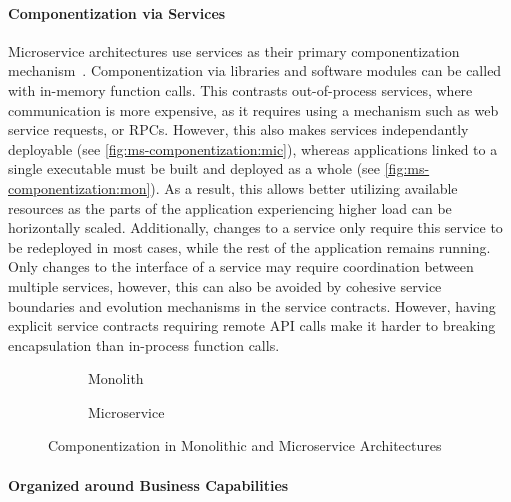 \paragraph{Componentization via Services}

Microservice architectures use services as their primary componentization mechanism~\cite{Lewis2014}.
Componentization via libraries and software modules can be called with in-memory function calls.
This contrasts out-of-process services, where communication is more expensive, as it requires using a mechanism such as web service requests, or \acp{RPC}.
However, this also makes services independantly deployable (see \autoref{fig:ms-componentization:mic}), whereas applications linked to a single executable must be built and deployed as a whole (see \autoref{fig:ms-componentization:mon}).
As a result, this allows better utilizing available resources as the parts of the application experiencing higher load can be horizontally scaled.
Additionally, changes to a service only require this service to be redeployed in most cases, while the rest of the application remains running.
Only changes to the interface of a service may require coordination between multiple services, however, this can also be avoided by cohesive service boundaries and evolution mechanisms in the service contracts.
However, having explicit service contracts requiring remote \ac{API} calls make it harder to breaking encapsulation than in-process function calls.

\begin{figure}[!htb]
    \centering
    \begin{subfigure}{.5\textwidth}
        \centering
        
        \caption{Monolith}
        \label{fig:ms-componentization:mon}
    \end{subfigure}%
    \begin{subfigure}{.5\textwidth}
        \centering
        
        \caption{Microservice}
        \label{fig:ms-componentization:mic}
    \end{subfigure}
    \caption{Componentization in Monolithic and Microservice Architectures~\cite{Lewis2014}}
    \label{fig:ms-componentization}
\end{figure}

\paragraph{Organized around Business Capabilities}

